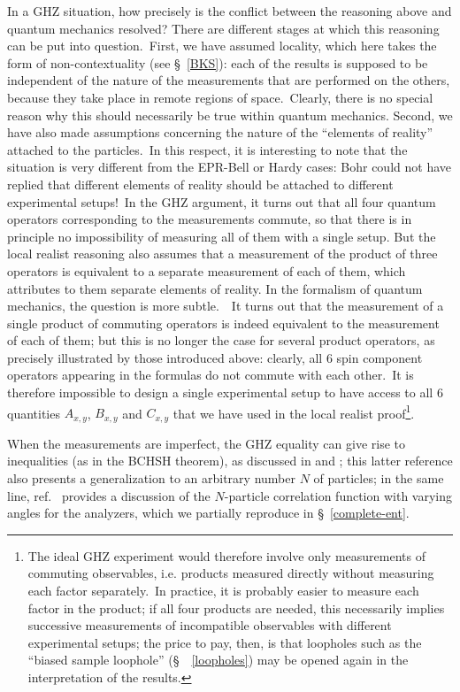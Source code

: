 \documentclass[12pt,onecolumn]{article}%
\begin{document}
In a GHZ situation, how precisely is the conflict between the reasoning above
and quantum mechanics resolved? There are different stages at which this
reasoning can be put into question.\ First, we have assumed locality, which
here takes the form of non-contextuality (see \S \ \ref{BKS}): each of the
results is supposed to be independent of the nature of the measurements that
are performed on the others, because they take place in remote regions of
space.\ Clearly, there is no special reason why this should necessarily be
true within quantum mechanics. Second, we have also made assumptions
concerning the nature of the ``elements of reality'' attached to the
particles.\ In this respect, it is interesting to note that the situation is
very different from the EPR-Bell or Hardy cases: Bohr could not have replied
that different elements of reality should be attached to different
experimental setups!\ In the GHZ argument, it turns out that all four quantum
operators corresponding to the measurements commute, so that there is in
principle no impossibility of measuring all of them with a single setup. But
the local realist reasoning also assumes that a measurement of the product of
three operators is equivalent to a separate measurement of each of them, which
attributes to them separate elements of reality. In the formalism of quantum
mechanics, the question is more subtle.\ \ It turns out that the measurement
of a single product of commuting operators is indeed equivalent to the
measurement of each of them; but this is no longer the case for several
product operators, as precisely illustrated by those introduced above:
clearly, all 6 spin component operators appearing in the formulas do not
commute with each other.\ It is therefore impossible to design a single
experimental setup to have access to all 6 quantities $A_{x,y}$, $B_{x,y}$ and
$C_{x,y}$ that we have used in the local realist proof\footnote{The ideal GHZ
experiment would therefore involve only measurements of commuting observables,
i.e. products measured directly without measuring each factor separately.\ In
practice, it is probably easier to measure each factor in the product; if all
four products are needed, this necessarily implies successive measurements of
incompatible observables with different experimental setups; the price to pay,
then, is that loopholes such as the ``biased sample loophole''
(\S \ \ \ref{loopholes}) may be opened again in the interpretation of the
results.}.

When the measurements are imperfect, the GHZ equality can give rise to
inequalities (as in the BCHSH theorem), as discussed in \cite{GHZ-bis} and
\cite{Mermin4}; this latter reference also presents a generalization to an
arbitrary number $N$ of particles; in the same line, ref.\ \cite{FL2} provides
a discussion of the $N$-particle correlation function with varying angles for
the analyzers, which we partially reproduce in \S \ \ref{complete-ent}.
\end{document}
